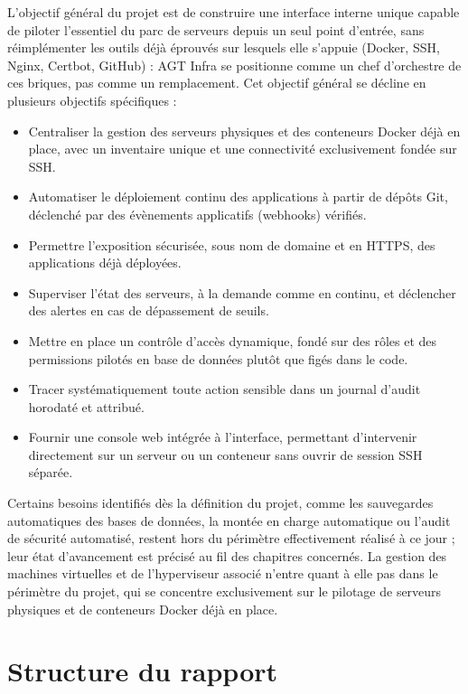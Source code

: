 L'objectif général du projet est de construire une interface interne
unique capable de piloter l'essentiel du parc de serveurs depuis un seul
point d'entrée, sans réimplémenter les outils déjà éprouvés sur lesquels
elle s'appuie (Docker, SSH, Nginx, Certbot, GitHub) : AGT Infra se
positionne comme un chef d'orchestre de ces briques, pas comme un
remplacement. Cet objectif général se décline en plusieurs objectifs
spécifiques :

\begin{itemize}
  \item Centraliser la gestion des serveurs physiques et des conteneurs
        Docker déjà en place, avec un inventaire unique et une connectivité
        exclusivement fondée sur SSH.
  \item Automatiser le déploiement continu des applications à partir de
        dépôts Git, déclenché par des évènements applicatifs (webhooks)
        vérifiés.
  \item Permettre l'exposition sécurisée, sous nom de domaine et en HTTPS,
        des applications déjà déployées.
  \item Superviser l'état des serveurs, à la demande comme en continu, et
        déclencher des alertes en cas de dépassement de seuils.
  \item Mettre en place un contrôle d'accès dynamique, fondé sur des rôles
        et des permissions pilotés en base de données plutôt que figés
        dans le code.
  \item Tracer systématiquement toute action sensible dans un journal
        d'audit horodaté et attribué.
  \item Fournir une console web intégrée à l'interface, permettant
        d'intervenir directement sur un serveur ou un conteneur sans ouvrir
        de session SSH séparée.
\end{itemize}

Certains besoins identifiés dès la définition du projet, comme les
sauvegardes automatiques des bases de données, la montée en charge
automatique ou l'audit de sécurité automatisé, restent hors du
périmètre effectivement réalisé à ce jour ; leur état d'avancement est
précisé au fil des chapitres concernés. La gestion des machines
virtuelles et de l'hyperviseur associé n'entre quant à elle pas dans le
périmètre du projet, qui se concentre exclusivement sur le pilotage de
serveurs physiques et de conteneurs Docker déjà en place.

\section*{Structure du rapport}

